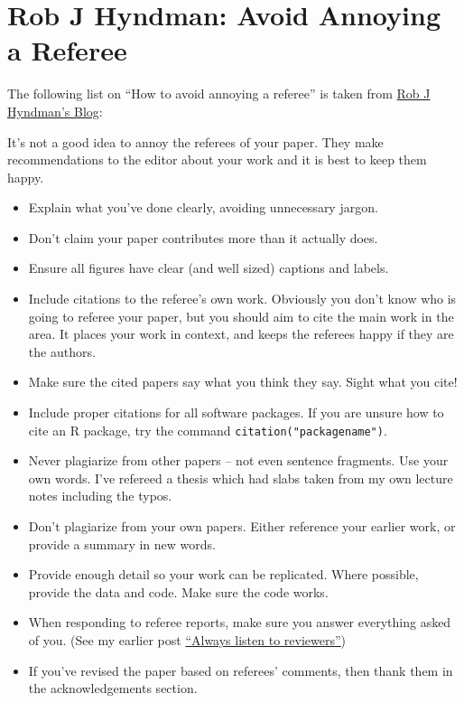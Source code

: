 \documentclass[]{book}
\providecommand{\tightlist}{%
  \setlength{\itemsep}{0pt}\setlength{\parskip}{0pt}}
\theoremstyle{definition}
\theoremstyle{definition}
\theoremstyle{definition}
\theoremstyle{remark}
\begin{document}
\hypertarget{rob-j-hyndman-avoid-annoying-a-referee}{%
\section{Rob J Hyndman: Avoid Annoying a Referee}\label{rob-j-hyndman-avoid-annoying-a-referee}}

The following list on ``How to avoid annoying a referee'' is taken from \href{https://robjhyndman.com/hyndsight/how-to-avoid-annoying-a-referee/}{Rob J Hyndman's Blog}:

It's not a good idea to annoy the referees of your paper. They make recommendations to the editor about your work and it is best to keep them happy.

\begin{itemize}
\tightlist
\item
  Explain what you've done clearly, avoiding unnecessary jargon.
\item
  Don't claim your paper contributes more than it actually does.
\item
  Ensure all figures have clear (and well sized) captions and labels.
\item
  Include citations to the referee's own work. Obviously you don't know who is going to referee your paper, but you should aim to cite the main work in the area. It places your work in context, and keeps the referees happy if they are the authors.
\item
  Make sure the cited papers say what you think they say. Sight what you cite!
\item
  Include proper citations for all software packages. If you are unsure how to cite an R package, try the command \texttt{citation("packagename")}.
\item
  Never plagiarize from other papers -- not even sentence fragments. Use your own words. I've refereed a thesis which had slabs taken from my own lecture notes including the typos.
\item
  Don't plagiarize from your own papers. Either reference your earlier work, or provide a summary in new words.
\item
  Provide enough detail so your work can be replicated. Where possible, provide the data and code. Make sure the code works.
\item
  When responding to referee reports, make sure you answer everything asked of you. (See my earlier post \href{https://robjhyndman.com/hyndsight/always-listen-to-reviewers/}{``Always listen to reviewers''})
\item
  If you've revised the paper based on referees' comments, then thank them in the acknowledgements section.
\end{itemize}
\end{document}
